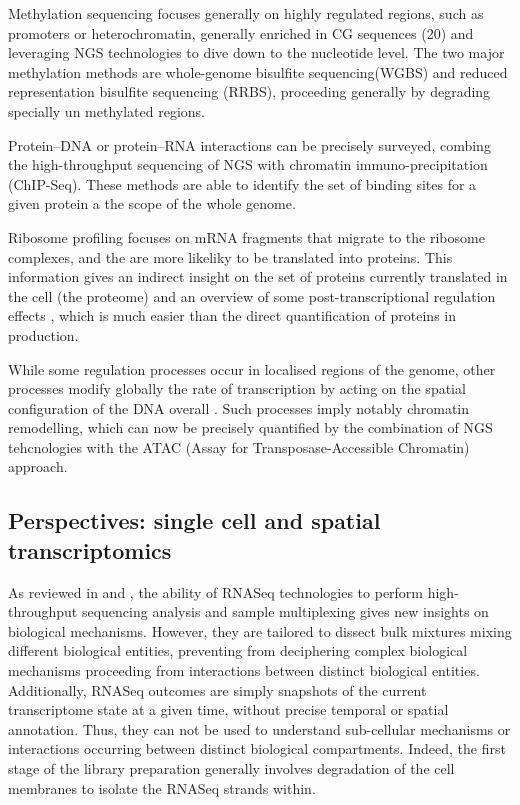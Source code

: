 \begin{enumerate}[label=(\roman*)]
Methylation sequencing focuses generally on highly regulated regions, such as promoters or heterochromatin, generally enriched in CG sequences (20) and leveraging NGS technologies to dive down to the nucleotide level. The two major methylation methods are whole-genome bisulfite sequencing(WGBS) and reduced representation bisulfite sequencing (RRBS), proceeding generally by degrading specially un methylated regions. 

Protein–DNA or protein–RNA interactions can be precisely surveyed, combing the high-throughput sequencing of NGS with chromatin immuno-precipitation (ChIP-Seq). These methods are able to identify the set of binding sites for a given protein a the scope of the whole genome. 

Ribosome profiling focuses on mRNA fragments that migrate to the ribosome complexes, and the are more likeliky to be translated into proteins. This information gives an indirect insight on the set of proteins currently translated in the cell (the proteome) and an overview of some post-transcriptional regulation effects , which is much easier than the direct quantification of proteins in production. 

While some regulation processes occur in localised regions of the genome, other processes modify globally the rate of transcription by acting on the spatial configuration of the DNA overall . Such processes imply notably chromatin remodelling, which can now be precisely quantified by the combination of NGS tehcnologies with the ATAC (Assay for Transposase-Accessible Chromatin) approach.
\end{enumerate}

\subsection{Perspectives: single cell and spatial transcriptomics}
\label{subsec:single-cell-spatial-transcript}
As reviewed in  and , the ability of RNASeq technologies to perform high-throughput sequencing analysis and sample multiplexing gives new insights on biological mechanisms. However, they are tailored to dissect bulk mixtures mixing different biological entities, preventing from deciphering complex biological mechanisms proceeding from interactions between distinct biological entities. Additionally, RNASeq outcomes are simply snapshots of the current transcriptome state at a given time, without precise temporal or spatial annotation. Thus, they can not be used to understand sub-cellular mechanisms or interactions occurring between distinct biological compartments. Indeed, the first stage of the library preparation generally involves degradation of the cell membranes to isolate the RNASeq strands within. 


